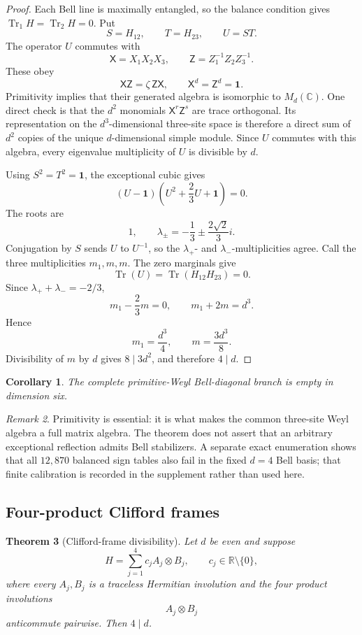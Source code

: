 \documentclass[11pt]{article}
\newtheorem{theorem}{Theorem}[section]
\newtheorem{corollary}[theorem]{Corollary}
\theoremstyle{definition}
\theoremstyle{remark}
\newtheorem{remark}[theorem]{Remark}
\newcommand{\Id}{\mathbf 1}
\newcommand{\Tr}{\operatorname{Tr}}
\newcommand{\bbC}{\mathbb C}
\begin{document}
\begin{proof}
Each Bell line is maximally entangled, so the balance condition gives
\(\Tr_1H=\Tr_2H=0\).
Put
\[
 S=H_{12},\qquad T=H_{23},\qquad U=ST.
\]
The operator \(U\) commutes with
\[
 \mathsf X=X_1X_2X_3,\qquad
 \mathsf Z=Z_1^{-1}Z_2Z_3^{-1}.
\]
These obey
\[
  \mathsf X\mathsf Z=\zeta\,\mathsf Z\mathsf X,
  \qquad \mathsf X^d=\mathsf Z^d=\Id.
\]
Primitivity implies that their generated algebra is isomorphic to
\(M_d(\bbC)\). One direct check is that the \(d^2\) monomials
\(\mathsf X^r\mathsf Z^s\) are trace orthogonal. Its representation on
the \(d^3\)-dimensional three-site space is therefore a direct sum of
\(d^2\) copies of the unique \(d\)-dimensional simple module. Since \(U\)
commutes with this algebra, every eigenvalue multiplicity of \(U\) is
divisible by \(d\).

Using \(S^2=T^2=\Id\), the exceptional cubic gives
\[
 (U-\Id)\left(U^2+\frac23U+\Id\right)=0.
\]
The roots are
\[
 1,\qquad
 \lambda_\pm=-\frac13\pm\frac{2\sqrt2}{3}i.
\]
Conjugation by \(S\) sends \(U\) to \(U^{-1}\), so the
\(\lambda_+\)- and \(\lambda_-\)-multiplicities agree. Call the three
multiplicities \(m_1,m,m\). The zero marginals give
\[
 \Tr(U)
 =\Tr(H_{12}H_{23})=0.
\]
Since \(\lambda_++\lambda_-=-2/3\),
\[
  m_1-\frac23m=0,\qquad m_1+2m=d^3.
\]
Hence
\[
  m_1=\frac{d^3}{4},\qquad m=\frac{3d^3}{8}.
\]
Divisibility of \(m\) by \(d\) gives \(8\mid3d^2\), and therefore
\(4\mid d\).
\end{proof}

\begin{corollary}
The complete primitive-Weyl Bell-diagonal branch is empty in dimension
six.
\end{corollary}

\begin{remark}
Primitivity is essential: it is what makes the common three-site Weyl
algebra a full matrix algebra. The theorem does not assert that an
arbitrary exceptional reflection admits Bell stabilizers. A separate exact
enumeration shows that all \(12{,}870\) balanced sign tables also fail in
the fixed \(d=4\) Bell basis; that finite calibration is recorded in the
supplement rather than used here.
\end{remark}

\subsection{Four-product Clifford frames}

\begin{theorem}[Clifford-frame divisibility]\label{thm:clifford}
Let \(d\) be even and suppose
\[
 H=\sum_{j=1}^4c_jA_j\otimes B_j,
 \qquad c_j\in\mathbb R\setminus\{0\},
\]
where every \(A_j,B_j\) is a traceless Hermitian involution and the four
\emph{product} involutions
\[
 A_j\otimes B_j
\]
anticommute pairwise. Then \(4\mid d\).
\end{theorem}
\end{document}
